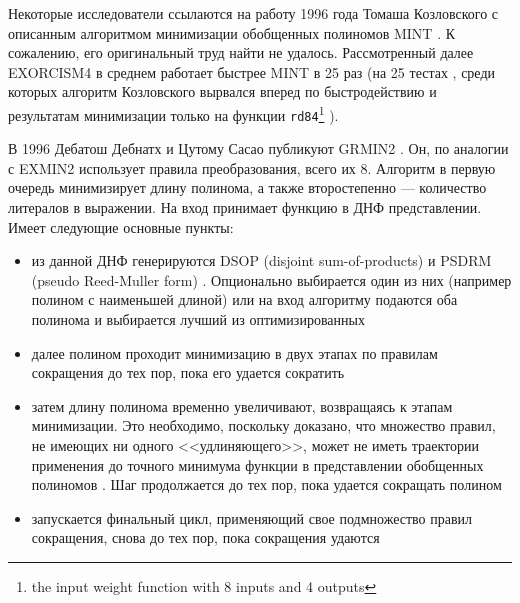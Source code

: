 \documentclass[a4paper,12pt,titlepage,finall]{article}
\begin{document}
Некоторые исследователи ссылаются на работу 1996 года Томаша Козловского с описанным алгоритмом минимизации обобщенных полиномов \textsc{MINT} \cite{mint}. К сожалению, его оригинальный труд найти не удалось. Рассмотренный далее \textsc{EXORCISM4} в среднем работает быстрее \textsc{MINT} в 25 раз (на 25 тестах \cite{exorcism4}, среди которых алгоритм Козловского вырвался вперед по быстродействию и результатам минимизации только на функции \texttt{rd84}\footnote{the input weight function with 8 inputs and 4 outputs} \cite{benchmark}).

В 1996 Дебатош Дебнатх и Цутому Сасао публикуют GRMIN2 \cite{grmin2}.
Он, по аналогии с \textsc{EXMIN2} использует правила преобразования, всего их 8. Алгоритм в первую очередь минимизирует длину полинома, а также второстепенно --- количество литералов в выражении. На вход принимает функцию в ДНФ представлении. Имеет следующие основные пункты:
\begin{itemize}
    \item из данной ДНФ генерируются DSOP (disjoint sum-of-products) \cite{exmin2} и PSDRM (pseudo Reed-Muller form) \cite{psdrm}. Опционально выбирается один из них (например полином с наименьшей длиной) или на вход алгоритму подаются оба полинома и выбирается лучший из оптимизированных
    \item далее полином проходит минимизацию в двух этапах по правилам сокращения до тех пор, пока его удается сократить
    \item затем длину полинома временно увеличивают, возвращаясь к этапам минимизации. Это необходимо, поскольку доказано, что множество правил, не имеющих ни одного <<удлиняющего>>, может не иметь траектории применения до точного минимума функции в представлении обобщенных полиномов \cite{convergence}. Шаг продолжается до тех пор, пока удается сокращать полином
    \item запускается финальный цикл, применяющий свое подмножество правил сокращения, снова до тех пор, пока сокращения удаются
\end{itemize}
\end{document}
